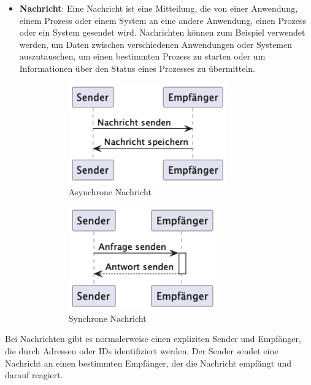 \begin{itemize}
\item \textbf{Nachricht}:
Eine Nachricht ist eine Mitteilung, die von einer Anwendung, einem Prozess oder einem System an eine andere Anwendung, einen Prozess oder ein System gesendet wird. Nachrichten können zum Beispiel verwendet werden, um Daten zwischen verschiedenen Anwendungen oder Systemen auszutauschen, um einen bestimmten Prozess zu starten oder um Informationen über den Status eines Prozesses zu übermitteln. 
\begin{figure}[!h]
    \centering
    \begin{subfigure}[b]{0.45\textwidth}
      \includegraphics[width=0.8\textwidth]{fig/uml/async-message.png}
      \caption{Asynchrone Nachricht}
      \label{fig:async-msg}
    \end{subfigure}
    \hfill
    \begin{subfigure}[b]{0.45\textwidth}
        \includegraphics[width=0.75\textwidth]{fig/uml/sync-message.png}
        \caption{Synchrone Nachricht}
        \label{fig:sync-msg}
    \end{subfigure}
    \caption{}
    \label{fig:gesamt}
\end{figure}
\end{itemize}  
Bei Nachrichten gibt es normalerweise einen expliziten Sender und Empfänger, die durch Adressen oder IDs identifiziert werden. Der Sender sendet eine Nachricht an einen bestimmten Empfänger, der die Nachricht empfängt und darauf reagiert.

